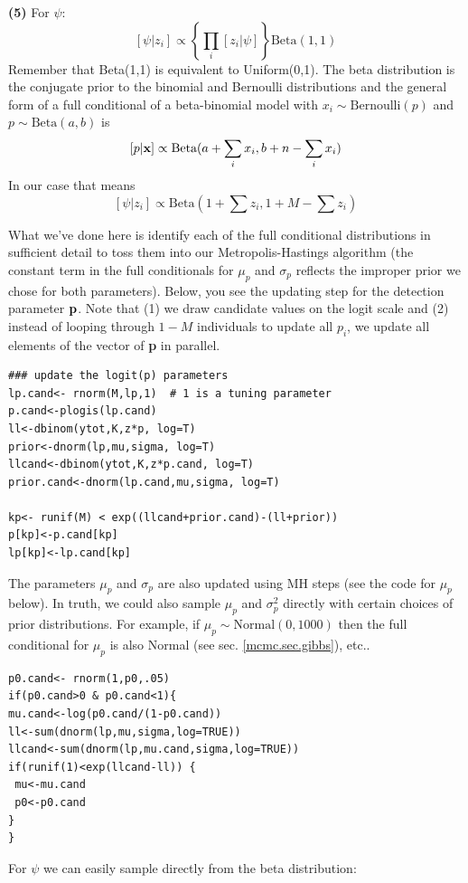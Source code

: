 {\bf (5)} For $\psi$:
\[
[\psi|z_{i}] \propto \left\{ \prod_{i} [z_{i}|\psi] \right\} \mbox{Beta}(1,1)
\]
Remember that \mbox{Beta}(1,1) is equivalent to \mbox{Uniform}(0,1). The beta distribution is the conjugate prior to the binomial and
Bernoulli distributions and the general form of a full conditional of a beta-binomial model
with $x_{i} \sim \mbox{Bernoulli} (p) $ and $p \sim \mbox{Beta}(a,b)$ is
\[
[p|{\bf x}] \propto \mbox{Beta}(a + \sum_i x_i, b + n-\sum_i x_i)
\]
In our case that means
\[
[\psi|z_{i}] \propto \mbox{Beta}(1 + \sum z_{i}, 1 + M - \sum z_{i})
\]

What we've done here is identify each of the full conditional
distributions in sufficient detail to toss them into our
Metropolis-Hastings algorithm (the constant term in the full
conditionals for $\mu_{p}$ and $\sigma_{p}$ reflects the improper
prior we chose for both parameters).  Below, you see the updating step
for the detection parameter ${\bf p}$. Note that (1) we draw candidate
values on the logit scale and (2) instead of looping through $1 - M$
individuals to update all $p_{i}$, we update all elements of the
vector of {\bf p} in parallel.

\begin{verbatim}
### update the logit(p) parameters
lp.cand<- rnorm(M,lp,1)  # 1 is a tuning parameter
p.cand<-plogis(lp.cand)
ll<-dbinom(ytot,K,z*p, log=T)
prior<-dnorm(lp,mu,sigma, log=T)
llcand<-dbinom(ytot,K,z*p.cand, log=T)
prior.cand<-dnorm(lp.cand,mu,sigma, log=T)

kp<- runif(M) < exp((llcand+prior.cand)-(ll+prior))
p[kp]<-p.cand[kp]
lp[kp]<-lp.cand[kp]
\end{verbatim}

The parameters $\mu_{p}$ and $\sigma_{p}$ are also updated using MH steps (see the code for $\mu_{p}$ below). In truth, we could also sample $\mu_{p}$
and $\sigma_{p}^{2}$ directly with certain choices of prior
distributions. For example, if $\mu_{p} \sim \mbox{Normal}(0, 1000)$
then the full conditional for $\mu_{p}$ is also Normal (see
sec. \ref{mcmc.sec.gibbs}), etc..

\begin{verbatim}
p0.cand<- rnorm(1,p0,.05)
if(p0.cand>0 & p0.cand<1){
mu.cand<-log(p0.cand/(1-p0.cand))
ll<-sum(dnorm(lp,mu,sigma,log=TRUE))
llcand<-sum(dnorm(lp,mu.cand,sigma,log=TRUE))
if(runif(1)<exp(llcand-ll)) {
 mu<-mu.cand
 p0<-p0.cand
}
}
\end{verbatim}

For $\psi$ we can easily sample directly from the beta distribution:

